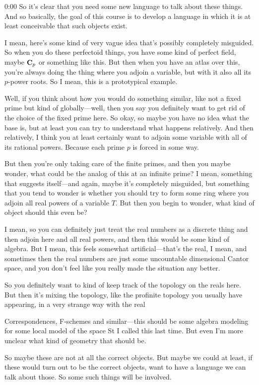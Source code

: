 \begin{unfinished}{0:00}
So it's clear that you need some new language to talk about these things. And so basically, the goal of this course is to develop a language in which it is at least conceivable that such objects exist.

I mean, here's some kind of very vague idea that's possibly completely misguided. So when you do these perfectoid things, you have some kind of perfect field, maybe $\mathbf C_p$ or something like this. But then when you have an atlas over this, you're always doing the thing where you adjoin a variable, but with it also all its $p$-power roots. So I mean, this is a prototypical example.

Well, if you think about how you would do something similar, like not a fixed prime but kind of globally---well, then you say you definitely want to get rid of the choice of the fixed prime here. So okay, so maybe you have no idea what the base is, but at least you can try to understand what happens relatively. And then relatively, I think you at least certainly want to adjoin some variable with all of its rational powers. Because each prime $p$ is forced in some way.

But then you're only taking care of the finite primes, and then you maybe wonder, what could be the analog of this at an infinite prime? I mean, something that suggests itself---and again, maybe it's completely misguided, but something that you tend to wonder is whether you should try to form some ring where you adjoin all real powers of a variable $T$. But then you begin to wonder, what kind of object should this even be?

I mean, so you can definitely just treat the real numbers as a discrete thing and then adjoin here and all real powers, and then this would be some kind of algebra. But I mean, this feels somewhat artificial---that's the real, I mean, and sometimes then the real numbers are just some uncountable dimensional Cantor space, and you don't feel like you really made the situation any better.

So you definitely want to kind of keep track of the topology on the reals here. But then it's mixing the topology, like the profinite topology you usually have appearing, in a very strange way with the real

Correspondences, F-schemes and similar---this should be some algebra modeling for some local model of the space St I called this last time. But even I'm more unclear what kind of geometry that should be.

So maybe these are not at all the correct objects. But maybe we could at least, if these would turn out to be the correct objects, want to have a language we can talk about those. So some such things will be involved.


\end{unfinished}
